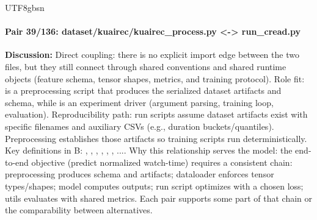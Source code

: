 \documentclass[11pt]{article}
\begin{document}
\begin{CJK*}{UTF8}{gbsn}
\paragraph{Pair 39/136: dataset/kuairec/kuairec\_process.py <-> run\_cread.py}
\textbf{Discussion:} Direct coupling: there is no explicit import edge between the two files, but they still connect through shared conventions and shared runtime objects (feature schema, tensor shapes, metrics, and training protocol). Role fit: \texttt{} is a preprocessing script that produces the serialized dataset artifacts and schema, while \texttt{} is an experiment driver (argument parsing, training loop, evaluation). Reproducibility path: run scripts assume dataset artifacts exist with specific filenames and auxiliary CSVs (e.g., duration buckets/quantiles). Preprocessing establishes those artifacts so training scripts run deterministically. Key definitions in B: \texttt{}, \texttt{}, \texttt{}, \texttt{}, \texttt{}, \texttt{}, .... Why this relationship serves the model: the end-to-end objective (predict normalized watch-time) requires a consistent chain: preprocessing produces schema and artifacts; dataloader enforces tensor types/shapes; model computes outputs; run script optimizes with a chosen loss; utils evaluates with shared metrics. Each pair supports some part of that chain or the comparability between alternatives.


\end{CJK*}
\end{document}
